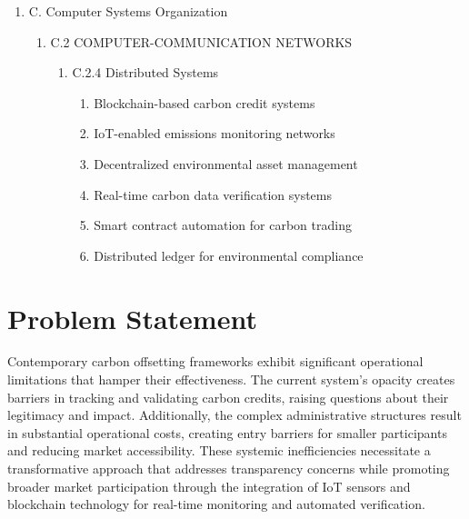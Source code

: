 \documentclass[oneside,a4paper,12pt]{book}
\begin{document}
\begin{enumerate}
	\item C. Computer Systems Organization 
	\begin{enumerate}
		\item C.2 COMPUTER-COMMUNICATION NETWORKS 
		\begin{enumerate}
			\item C.2.4 Distributed Systems 
			\begin{enumerate}
				\item Blockchain-based carbon credit systems
\item IoT-enabled emissions monitoring networks
\item Decentralized environmental asset management
\item Real-time carbon data verification systems
\item Smart contract automation for carbon trading
\item Distributed ledger for environmental compliance
	 		\end{enumerate} 
		\end{enumerate} 
	\end{enumerate}
\end{enumerate}

\newpage
\section{Problem Statement}
\label{sec:problem}
Contemporary carbon offsetting frameworks exhibit significant operational limitations that hamper their effectiveness. The current system's opacity creates barriers in tracking and validating carbon credits, raising questions about their legitimacy and impact. Additionally, the complex administrative structures result in substantial operational costs, creating entry barriers for smaller participants and reducing market accessibility. These systemic inefficiencies necessitate a transformative approach that addresses transparency concerns while promoting broader market participation through the integration of IoT sensors and blockchain technology for real-time monitoring and automated verification.
\end{document}
